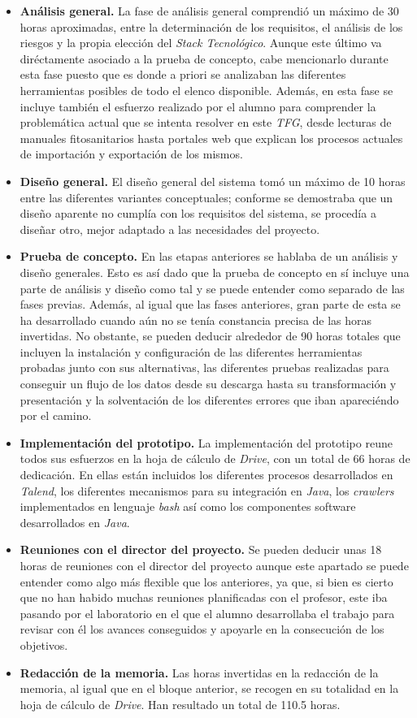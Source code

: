 \begin{itemize}
\item \textbf{Análisis general. } La fase de análisis general comprendió un máximo de 30 horas aproximadas, entre la determinación de los requisitos, el análisis de los riesgos y la propia elección del \textit{Stack Tecnológico}. Aunque este último va diréctamente asociado a la prueba de concepto, cabe mencionarlo durante esta fase puesto que es donde a priori se analizaban las diferentes herramientas posibles de todo el elenco disponible. Además, en esta fase se incluye también el esfuerzo realizado por el alumno para comprender la problemática actual que se intenta resolver en este \textit{TFG}, desde lecturas de manuales fitosanitarios hasta portales web que explican los procesos actuales de importación y exportación de los mismos.
\item \textbf{Diseño general. } El diseño general del sistema tomó un máximo de 10 horas entre las diferentes variantes conceptuales; conforme se demostraba que un diseño aparente no cumplía con los requisitos del sistema, se procedía a diseñar otro, mejor adaptado a las necesidades del proyecto. 
\item \textbf{Prueba de concepto. } En las etapas anteriores se hablaba de un análisis y diseño generales. Esto es así dado que la prueba de concepto en sí incluye una parte de análisis y diseño como tal y se puede entender como separado de las fases previas. Además, al igual que las fases anteriores, gran parte de esta se ha desarrollado cuando aún no se tenía constancia precisa de las horas invertidas. No obstante, se pueden deducir alrededor de 90 horas totales que incluyen la instalación y configuración de las diferentes herramientas probadas junto con sus alternativas, las diferentes pruebas realizadas para conseguir un flujo de los datos desde su descarga hasta su transformación y presentación y la solventación de los diferentes errores que iban apareciéndo por el camino. 
\item \textbf{Implementación del prototipo. } La implementación del prototipo reune todos sus esfuerzos en la hoja de cálculo de \textit{Drive}, con un total de 66 horas de dedicación. En ellas están incluidos los diferentes procesos desarrollados en \textit{Talend}, los diferentes mecanismos para su integración en \textit{Java}, los \textit{crawlers} implementados en lenguaje \textit{bash} así como los  componentes software desarrollados en \textit{Java}. 
\item \textbf{Reuniones con el director del proyecto. } Se pueden deducir unas 18 horas de reuniones con el director del proyecto aunque este apartado se puede entender como algo más flexible que los anteriores, ya que, si bien es cierto que no han habido muchas reuniones planificadas con el profesor, este iba pasando por el laboratorio en el que el alumno desarrollaba el trabajo para revisar con él los avances conseguidos y apoyarle en la consecución de los objetivos. 
\item \textbf{Redacción de la memoria. } Las horas invertidas en la redacción de la memoria, al igual que en el bloque anterior, se recogen en su totalidad en la hoja de cálculo de \textit{Drive}. Han resultado un total de 110.5 horas.
\end{itemize}

